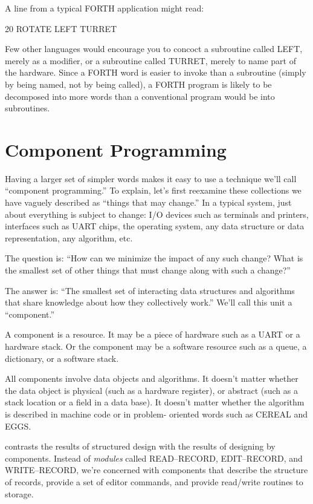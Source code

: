 A line from a typical FORTH application might read:

\begin{Code}
20 ROTATE LEFT TURRET
\end{Code}
Few other languages would encourage you to concoct a subroutine called
LEFT, merely as a modifier, or a subroutine called TURRET, merely
to name part of the hardware. Since a FORTH word is easier to invoke
than a subroutine (simply by being named, not by being called), a
FORTH program is likely to be decomposed into more words than a conventional
program would be into subroutines.


\section{Component Programming}
Having a larger set of simpler words makes it easy to use a technique
we'll call ``component programming.'' To explain, let's first reexamine
these collections we have vaguely described as ``things that may change.''
In a typical system, just about everything is subject to change: I/O
devices such as terminals and printers, interfaces such as UART chips,
the operating system, any data structure or data representation, any
algorithm, etc.

The question is: ``How can we minimize the impact of any such change?
What is the smallest set of other things that must change along with
such a change?''

The answer is: ``The smallest set of interacting data structures and
algorithms that share knowledge about how they collectively work.''
We'll call this unit a ``component.''

A component is a resource. It may be a piece of hardware such as a
UART or a hardware stack. Or the component may be a software resource
such as a queue, a dictionary, or a software stack.

All components involve data objects and algorithms. It doesn't matter
whether the data object is physical (such as a hardware register),
or abstract (such as a stack location or a field in a data base).
It doesn't matter whether the algorithm is described in machine code
or in problem- oriented words such as CEREAL and EGGS.


 contrasts the results of structured design with the results
of designing by components. Instead of \emph{modules} called READ--RECORD,
EDIT--RECORD, and WRITE--RECORD, we're concerned with components
that describe the structure of records, provide a set of editor commands,
and provide read/write routines to storage.

